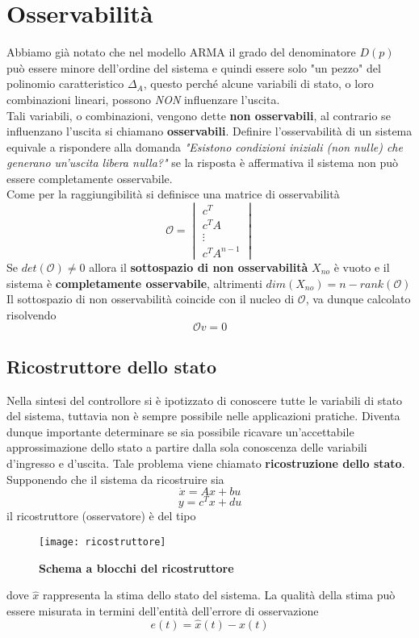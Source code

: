\documentclass[a4paper]{article}
\begin{document}
	\section{Osservabilità}
	Abbiamo già notato che nel modello ARMA il grado del denominatore $D(p)$ può essere minore dell'ordine del sistema e quindi essere solo "un pezzo" del polinomio caratteristico $\Delta_A$, questo perché alcune variabili di stato, o loro combinazioni lineari, possono \emph{NON} influenzare l'uscita. \\Tali variabili, o combinazioni, vengono dette \textbf{non osservabili}, al contrario se influenzano l'uscita si chiamano \textbf{osservabili}.
	Definire l'osservabilità di un sistema equivale a rispondere alla domanda \emph{"Esistono condizioni iniziali (non nulle) che generano un'uscita libera nulla?"} se la risposta è affermativa il sistema non può essere completamente osservabile. \\Come per la raggiungibilità si definisce una matrice di osservabilità 
	\[\mathcal{O}=
	\begin{vmatrix}
	c^T\\
	c^TA\\
	\vdots\\
	c^TA^{n-1}
	\end{vmatrix}\] 
	Se $det(\mathcal{O})\ne0$ allora il \textbf{sottospazio di non osservabilità} $X_{no}$ è vuoto e il sistema è \textbf{completamente osservabile}, altrimenti $dim(X_{no})=n-rank(\mathcal{O})$\\
	Il sottospazio di non osservabilità coincide con il nucleo di $\mathcal{O}$, va dunque calcolato risolvendo \[\mathcal{O}v=0\]
	
	\subsection{Ricostruttore dello stato}
	Nella sintesi del controllore si è ipotizzato di conoscere tutte le variabili di stato del sistema, tuttavia non è sempre possibile nelle applicazioni pratiche. Diventa dunque importante determinare se sia possibile ricavare un'accettabile approssimazione dello stato a partire dalla sola conoscenza delle variabili d'ingresso e d'uscita. Tale problema viene chiamato \textbf{ricostruzione dello stato}.
	Supponendo che il sistema da ricostruire sia \[\dot{x}=Ax+bu\]\[y=c^Tx+du\] il ricostruttore (osservatore) è del tipo 
	\begin{figure}[H]
		\centering
		\texttt{[image: ricostruttore]}%
		\caption{\textbf{Schema a blocchi del ricostruttore}}
	\end{figure}
	dove $\hat{x}$ rappresenta la stima dello stato del sistema. La qualità della stima	può essere misurata in termini dell'entità dell'errore di osservazione \[e(t)=\hat{x}(t)-x(t)\]
	
\end{document}
